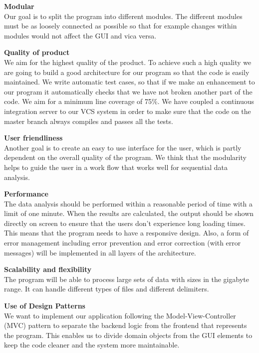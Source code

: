 \documentclass[a4paper,english,fleqn]{exam}
\begin{document}
\textbf{Modular}\\
Our goal is to split the program into different modules. The different modules must be as loosely connected as possible so that for example changes within modules would not affect the GUI and vica versa.

\textbf{Quality of product}\\
We aim for the highest quality of the product. To achieve such a high quality we are going to build a good architecture for our program so that the code is easily maintained. We write automatic test cases, so that if we make an enhancement to our program it automatically checks that we have not broken another part of the code. We aim for a minimum line coverage of 75\%. We have coupled a continuous integration server to our VCS system in order to make sure that the code on the master branch always compiles and passes all the tests. 

\textbf{User friendliness}\\
Another goal is to create an easy to use interface for the user, which is partly dependent on the overall quality of the program. We think that the modularity helps to guide the user in a work flow that works well for sequential data analysis.

\textbf{Performance} \\
The data analysis should be performed within a reasonable period of time with a limit of one minute. When the results are calculated, the output should be shown directly on screen to ensure that the users don't experience long loading times. This means that the program needs to have a responsive design. Also, a form of error management including error prevention and error correction (with error messages) will be implemented in all layers of the architecture.

\textbf{Scalability and flexibility}\\
The program will be able to process large sets of data with sizes in the gigabyte range. It can handle different types of files and different delimiters.

\textbf{Use of Design Patterns} \\
We want to implement our application following the Model-View-Controller (MVC) pattern to separate the backend logic from the frontend that represents the program. This enables us to divide domain objects from the GUI elements to keep the code cleaner and the system more maintainable. 



\newpage
\end{document}
